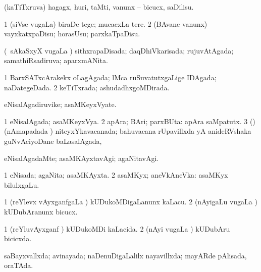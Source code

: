 {\bentry
{} 
\gl{\sakirx}
\expl{}
\bmng
 (kaTiTxruva) hagagx, huri, taMti, \mo vanunx -- bicucx, saDilisu. 
\emng
\eentry

\bentry
{} 
\gl{\sakirx}
\expl{}
\bmng
\bnum
\num{1} (siVse \mo vugaLa) biraDe tege; mucacxLa tere. 
\num{2} (BAvane \mo vanunx) vayxkatxpaDisu; horasUsu; parxkaTpaDisu. 
\enum
\emng
\eentry

\bentry
{} 
\gl{\gu}
\expl{}
\bmng
 (\kanmu\ sAkaSxyX \mo vugaLa \vi) sithxrapaDisada; daqDhiVkarisada; rujuvAtAgada; samathiRsadiruva; aparxmANita. 
\emng
\eentry

\bentry
{} 
\gl{\gu}
\expl{}
\bmng
\bnum
\num{1} BarxSATxcArakekx oLagAgada; lMca ruSuvatutxgaLige IDAgada; naDategeDada. 
\num{2} keTiTxrada; ashudadhxgoMDirada. 
\enum
\emng
\eentry

\bentry
{} 
\gl{\nA}
\expl{}
\bmng
 eNisalAgadiruvike; asaMKeyxVyate. 
\emng
\eentry

\bentry
{} 
\gl{\gu}
\expl{}
\bmng
\bnum
\num{1} eNisalAgada; asaMKeyxVya. 
\num{2} apAra; BAri; parxBUta:  apAra saMpatutx. 
\num{3} (\vAyx) (nAmapadada \vi) niteyxYkavacanada; bahuvacana rUpavillxda yA anideRVshaka guNvAciyoDane baLasalAgada, \udA\  
\enum
\emng
\eentry

\bentry
{} 
\gl{\kirxvi}
\expl{}
\bmng
 eNisalAgadaMte; asaMKAyxtavAgi; agaNitavAgi. 
\emng
\eentry

\bentry
{} 
\gl{\gu}
\expl{}
\bmng
\bnum
\num{1} eNisada; agaNita; asaMKAyxta. 
\num{2} asaMKyx; aneVkAneVka:  asaMKyx bilulxgaLu. 
\enum
\emng
\eentry

\bentry
{} 
\gl{\sakirx}
\expl{}
\bmng
\bnum
\num{1} (reYlevx vAyxganfgaLa \vi) kUDukoMDigaLanunx kaLacu. 
\num{2} (nAyigaLu \mo vugaLa \vi) kUDubAranunx bicucx. 
\enum
\emng
\eentry

\bentry
{} 
\gl{\gu}
\expl{}
\bmng
\bnum
\num{1} (reYluvAyxganf \vi) kUDukoMDi kaLacida. 
\num{2} (nAyi \mo vugaLa \vi) kUDubAru bicicxda. 
\enum
\emng
\eentry

\bentry
{} 
\gl{\gu}
\expl{}
\bmng
 saBayxvallxda; avinayada; naDenuDigaLalilx nayavillxda; mayARde pAlisada, oraTAda. 
\emng
\eentry

}
